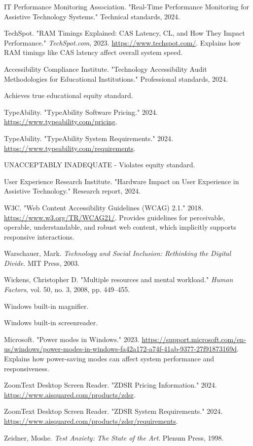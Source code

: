 \begin{thebibliography}{99}
IT Performance Monitoring Association. "Real-Time Performance Monitoring for Assistive Technology Systems." Technical standards, 2024.

TechSpot. "RAM Timings Explained: CAS Latency, CL, and How They Impact Performance." \emph{TechSpot.com}, 2023. \url{https://www.techspot.com/}. Explains how RAM timings like CAS latency affect overall system speed.

Accessibility Compliance Institute. "Technology Accessibility Audit Methodologies for Educational Institutions." Professional standards, 2024.

Achieves true educational equity standard.

TypeAbility. "TypeAbility Software Pricing." 2024. \url{https://www.typeability.com/pricing}.

TypeAbility. "TypeAbility System Requirements." 2024. \url{https://www.typeability.com/requirements}.

UNACCEPTABLY INADEQUATE - Violates equity standard.

User Experience Research Institute. "Hardware Impact on User Experience in Assistive Technology." Research report, 2024.

W3C. "Web Content Accessibility Guidelines (WCAG) 2.1." 2018. \url{https://www.w3.org/TR/WCAG21/}. Provides guidelines for perceivable, operable, understandable, and robust web content, which implicitly supports responsive interactions.

Warschauer, Mark. \emph{Technology and Social Inclusion: Rethinking the Digital Divide}. MIT Press, 2003.

Wickens, Christopher D. "Multiple resources and mental workload." \emph{Human Factors}, vol. 50, no. 3, 2008, pp. 449--455.

Windows built-in magnifier.

Windows built-in screenreader.

Microsoft. "Power modes in Windows." 2023. \url{https://support.microsoft.com/en-us/windows/power-modes-in-windows-fa42a172-a74f-41ab-9377-27f91873169d}. Explains how power-saving modes can affect system performance and responsiveness.

ZoomText Desktop Screen Reader. "ZDSR Pricing Information." 2024. \url{https://www.aisquared.com/products/zdsr}.

ZoomText Desktop Screen Reader. "ZDSR System Requirements." 2024. \url{https://www.aisquared.com/products/zdsr/requirements}.

Zeidner, Moshe. \emph{Test Anxiety: The State of the Art}. Plenum Press, 1998.
\end{thebibliography}
